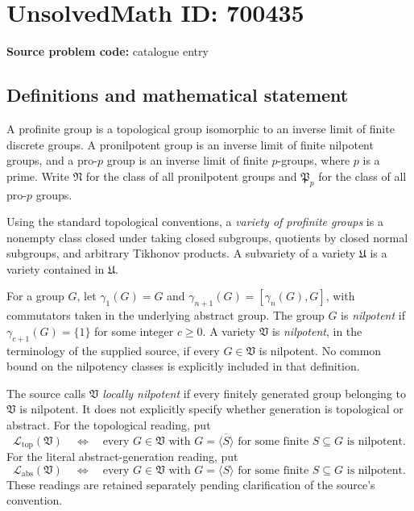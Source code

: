 \documentclass[11pt]{article}
\begin{document}
\section*{UnsolvedMath ID: 700435}
\textbf{Source problem code:} catalogue entry
\subsection{Definitions and mathematical statement}
A profinite group is a topological group isomorphic to an inverse limit of finite discrete groups. A pronilpotent group is an inverse limit of finite nilpotent groups, and a pro-$p$ group is an inverse limit of finite $p$-groups, where $p$ is a prime. Write $\mathfrak N$ for the class of all pronilpotent groups and $\mathfrak P_p$ for the class of all pro-$p$ groups.

Using the standard topological conventions, a \emph{variety of profinite groups} is a nonempty class closed under taking closed subgroups, quotients by closed normal subgroups, and arbitrary Tikhonov products. A subvariety of a variety $\mathfrak U$ is a variety contained in $\mathfrak U$.

For a group $G$, let $\gamma_1(G)=G$ and $\gamma_{n+1}(G)=[\gamma_n(G),G]$, with commutators taken in the underlying abstract group. The group $G$ is \emph{nilpotent} if $\gamma_{c+1}(G)=\{1\}$ for some integer $c\geq 0$. A variety $\mathfrak V$ is \emph{nilpotent}, in the terminology of the supplied source, if every $G\in\mathfrak V$ is nilpotent. No common bound on the nilpotency classes is explicitly included in that definition.

The source calls $\mathfrak V$ \emph{locally nilpotent} if every finitely generated group belonging to $\mathfrak V$ is nilpotent. It does not explicitly specify whether generation is topological or abstract. For the topological reading, put
\[
\mathcal L_{\mathrm{top}}(\mathfrak V)
\quad\Longleftrightarrow\quad
\text{every }G\in\mathfrak V\text{ with }G=\overline{\langle S\rangle}
\text{ for some finite }S\subseteq G\text{ is nilpotent}.
\]
For the literal abstract-generation reading, put
\[
\mathcal L_{\mathrm{abs}}(\mathfrak V)
\quad\Longleftrightarrow\quad
\text{every }G\in\mathfrak V\text{ with }G=\langle S\rangle
\text{ for some finite }S\subseteq G\text{ is nilpotent}.
\]
These readings are retained separately pending clarification of the source's convention.
\end{document}
